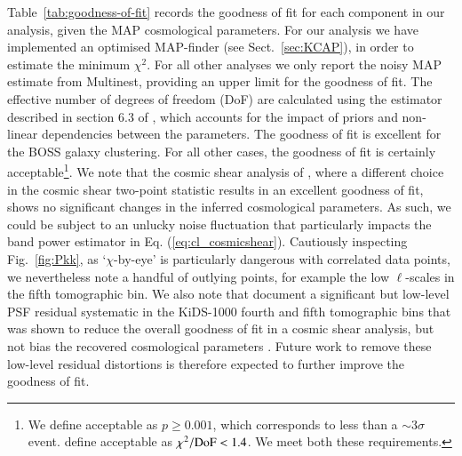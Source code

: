 Table~\ref{tab:goodness-of-fit} records the goodness of fit for each component in our \tttp analysis, given the MAP cosmological parameters.  For our \tttp analysis we have implemented an optimised MAP-finder (see Sect.~\ref{sec:KCAP}), in order to estimate the minimum $\chi^2$.  For all other analyses we only report the noisy MAP estimate from {\sc Multinest}, providing an upper limit for the goodness of fit.  
The effective number of degrees of freedom (DoF) are calculated using the estimator described in section 6.3 of \citet{joachimi/etal:inprep}, which accounts for the impact of priors and non-linear dependencies between the parameters.  
The goodness of fit is excellent for the BOSS galaxy clustering.  For all other cases, the goodness of fit is certainly acceptable\footnote{We define acceptable as $p \geq 0.001$, which corresponds to less than a $\sim 3\sigma$ event.   \citet{abbott/etal:2018} define acceptable as $\chi^2/{\rm DoF} < 1.4$.  We meet both these requirements.}.
We note that the cosmic shear analysis of \citet{asgari/etal:inprep}, where a different choice in the cosmic shear two-point statistic results in an excellent goodness of fit, shows no significant changes in the inferred cosmological parameters.    As such, we could be subject to an unlucky noise fluctuation that particularly impacts the band power estimator in Eq. (\ref{eq:cl_cosmicshear}).  Cautiously inspecting Fig.~\ref{fig:Pkk}, as `$\chi$-by-eye' is particularly dangerous with correlated data points, we nevertheless note a handful of outlying points, for example the low $\ell$-scales in the fifth tomographic bin.   We also note that \citet{giblin/etal:inprep} document a significant but low-level PSF residual systematic in the KiDS-1000 fourth and fifth tomographic bins that was shown to reduce the overall goodness of fit in a cosmic shear analysis, but not bias the recovered cosmological parameters \citep[see also the discussion in][]{amara/refregier:2008}.  Future work to remove these low-level residual distortions is therefore expected to further improve the goodness of fit.

